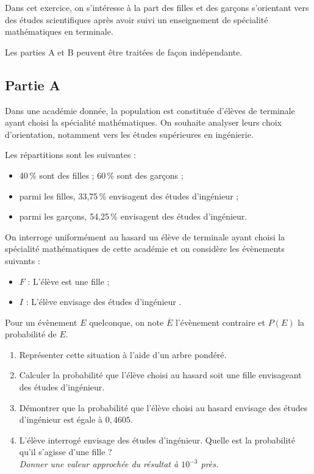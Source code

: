 \medskip

Dans cet exercice, on s'intéresse à la part des filles et des garçons s'orientant vers des études scientifiques après avoir suivi un enseignement de spécialité mathématiques en terminale.

 Les parties A et B peuvent être traitées de façon indépendante.

\subsection*{Partie A}

Dans une académie donnée, la population est constituée d'élèves de terminale ayant choisi la spécialité mathématiques. On souhaite analyser leurs choix d'orientation, notamment vers les études supérieures en ingénierie.

Les répartitions sont les suivantes :

\begin{itemize}[noitemsep]
\item 40\,\% sont des filles ; 60\,\% sont des garçons ;
\item parmi les filles, 33,75\,\% envisagent des études d'ingénieur ;
\item parmi les garçons, 54,25\,\% envisagent des études d'ingénieur.
\end{itemize}

On interroge uniformément au hasard un élève de terminale ayant choisi la spécialité mathématiques de cette académie et on considère les évènements suivants :
\begin{itemize}[noitemsep]
\item $F$ : \og L'élève est une fille \fg ;
\item $I$ : \og L'élève envisage des études d'ingénieur \fg.
\end{itemize}

 Pour un évènement $E$ quelconque, on note $\overline{E}$ l'évènement contraire et $P(E)$ la probabilité de $E$.

\begin{enumerate}
\item Représenter cette situation à l'aide d'un arbre pondéré.
\item Calculer la probabilité que l'élève choisi au hasard soit une fille envisageant des études d'ingénieur.
\item Démontrer que la probabilité que l'élève choisi au hasard envisage des études d'ingénieur est égale à $0{,}4605$.
\item L'élève interrogé envisage des études d'ingénieur. Quelle est la probabilité qu'il s'agisse d'une fille ?\\
\textit{Donner une valeur approchée du résultat à $10^{-3}$ près.}
\end{enumerate}

